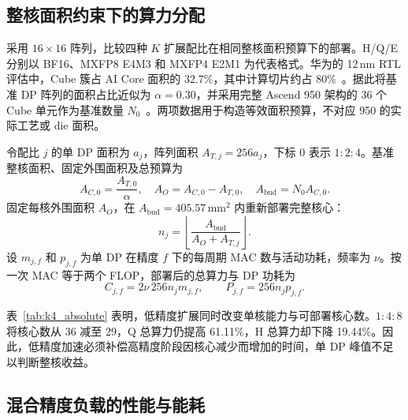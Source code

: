 \subsection{整核面积约束下的算力分配}
\label{sec:k4_area}

采用 $16\times16$ 阵列，比较四种 $K$ 扩展配比在相同整核面积预算下的部署。H/Q/E 分别以 BF16、MXFP8 E4M3 和 MXFP4 E2M1 为代表格式。华为的 12\,nm RTL 评估中，Cube 簇占 AI Core 面积的 32.7\%，其中计算切片约占 80\%~\cite{luo2024hifloat8area}。据此将基准 DP 阵列的面积占比近似为 $\alpha=0.30$，并采用完整 Ascend 950 架构的 36 个 Cube 单元作为基准数量 $N_0$~\cite{huawei950}。两项数据用于构造等效面积预算，不对应 950 的实际工艺或 die 面积。

令配比 $j$ 的单 DP 面积为 $a_j$，阵列面积 $A_{T,j}=256a_j$，下标 0 表示 $1:2:4$。基准整核面积、固定外围面积及总预算为
\begin{equation}
A_{C,0}=\frac{A_{T,0}}{\alpha},\quad
A_O=A_{C,0}-A_{T,0},\quad
A_{\mathrm{bud}}=N_0A_{C,0}.
\label{eq:k4_area_definition}
\end{equation}
固定每核外围面积 $A_O$，在 $A_{\mathrm{bud}}=405.57$\,mm$^2$ 内重新部署完整核心：
\begin{equation}
n_j=\left\lfloor\frac{A_{\mathrm{bud}}}{A_O+A_{T,j}}\right\rfloor.
\label{eq:core_area_budget}
\end{equation}
设 $m_{j,f}$ 和 $p_{j,f}$ 为单 DP 在精度 $f$ 下的每周期 MAC 数与活动功耗，频率为 $\nu$。按一次 MAC 等于两个 FLOP，部署后的总算力与 DP 功耗为
\begin{equation}
C_{j,f}=2\nu\,256n_jm_{j,f},\qquad
P_{j,f}=256n_jp_{j,f}.
\label{eq:k4_capacity_power}
\end{equation}

表~\ref{tab:k4_absolute} 表明，低精度扩展同时改变单核能力与可部署核心数。$1:4:8$ 将核心数从 36 减至 29，Q 总算力仍提高 61.11\%，H 总算力却下降 19.44\%。因此，低精度加速必须补偿高精度阶段因核心减少而增加的时间，单 DP 峰值不足以判断整核收益。

\begin{table}[!t]
\centering
\caption{Area-constrained N12 deployment. $A_C$: core area (mm$^2$); $C$: TFLOP/s; $P$: DP-only power (W).}
\label{tab:k4_absolute}
\begingroup\footnotesize\setlength{\tabcolsep}{3pt}

\endgroup
\end{table}

\subsection{混合精度负载的性能与能耗}
\label{sec:k4_simplex}


